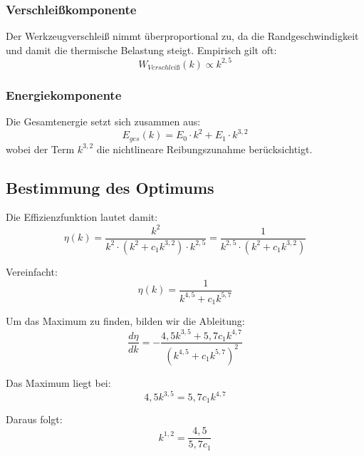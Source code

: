 ﻿\documentclass[12pt,a4paper]{article}
\begin{document}
\subsubsection{Verschleißkomponente}

Der Werkzeugverschleiß nimmt überproportional zu, da die Randgeschwindigkeit und damit die thermische Belastung steigt. Empirisch gilt oft:
\begin{equation}
	W_{Verschleiß}(k) \propto k^{2{,}5}
\end{equation}

\subsubsection{Energiekomponente}

Die Gesamtenergie setzt sich zusammen aus:
\begin{equation}
	E_{ges}(k) = E_0 \cdot k^2 + E_1 \cdot k^{3{,}2}
\end{equation}
wobei der Term $k^{3{,}2}$ die nichtlineare Reibungszunahme berücksichtigt.

\subsection{Bestimmung des Optimums}

Die Effizienzfunktion lautet damit:
\begin{equation}
	\eta(k) = \frac{k^2}{k^2 \cdot (k^2 + c_1 k^{3{,}2}) \cdot k^{2{,}5}} = \frac{1}{k^{2{,}5} \cdot (k^2 + c_1 k^{3{,}2})}
\end{equation}

Vereinfacht:
\begin{equation}
	\eta(k) = \frac{1}{k^{4{,}5} + c_1 k^{5{,}7}}
\end{equation}

Um das Maximum zu finden, bilden wir die Ableitung:
\begin{equation}
	\frac{d\eta}{dk} = -\frac{4{,}5 k^{3{,}5} + 5{,}7 c_1 k^{4{,}7}}{(k^{4{,}5} + c_1 k^{5{,}7})^2}
\end{equation}

Das Maximum liegt bei:
\begin{equation}
	4{,}5 k^{3{,}5} = 5{,}7 c_1 k^{4{,}7}
\end{equation}

Daraus folgt:
\begin{equation}
	k^{1{,}2} = \frac{4{,}5}{5{,}7 c_1}
\end{equation}
\end{document}
